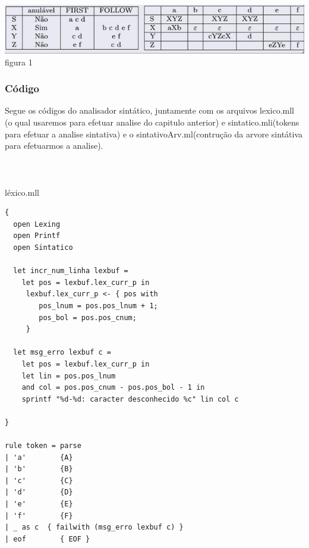 \documentclass{article}
\begin{document}
\begin{center}
    \includegraphics[scale=0.5]{TabelaSintatico.jpg}
    figura 1
\end{center}

\subsubsection{Código}
Segue os códigos do analisador sintático, juntamente com os arquivos lexico.mll (o qual usaremos para efetuar analise do capitulo anterior) e sintatico.mli(tokens para efetuar a analise sintativa) e o sintativoArv.ml(contrução da arvore sintátiva para efetuarmos a analise).\\

\\\\\\léxico.mll
\begin{lstlisting}
{
  open Lexing
  open Printf
  open Sintatico
         
  let incr_num_linha lexbuf = 
    let pos = lexbuf.lex_curr_p in
     lexbuf.lex_curr_p <- { pos with
        pos_lnum = pos.pos_lnum + 1;
        pos_bol = pos.pos_cnum;
     }

  let msg_erro lexbuf c =
    let pos = lexbuf.lex_curr_p in
    let lin = pos.pos_lnum
    and col = pos.pos_cnum - pos.pos_bol - 1 in
    sprintf "%d-%d: caracter desconhecido %c" lin col c

}

rule token = parse 
| 'a'        {A}
| 'b'        {B}
| 'c'        {C}
| 'd'        {D}
| 'e'        {E}
| 'f'        {F}
| _ as c  { failwith (msg_erro lexbuf c) }
| eof        { EOF }
\end{lstlisting}
\end{document}
